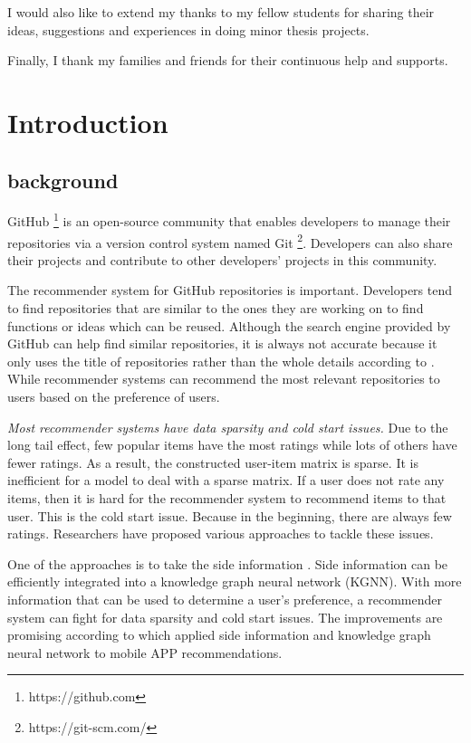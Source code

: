 \documentclass[11pt,twoside]{report}
\begin{document}
I would also like to extend my thanks to my fellow students for sharing their ideas, suggestions and experiences in doing minor thesis projects.

Finally, I thank my families and friends for their continuous help and supports.

{
    \hypersetup{linkcolor=black}
    \tableofcontents
    \listoffigures
    \listoftables
}


\chapter{Introduction}
\section{background}
GitHub \footnote{https://github.com} is an open-source community that enables developers to manage their repositories via a version control system named Git \footnote{https://git-scm.com/}. Developers can also share their projects and contribute to other developers’ projects in this community.

The recommender system for GitHub repositories is important. Developers tend to find repositories that are similar to the ones they are working on to find functions or ideas which can be reused. Although the search engine provided by GitHub can help find similar repositories, it is always not accurate because it only uses the title of repositories rather than the whole details according to \cite{xu_repersp_2017}. While recommender systems can recommend the most relevant repositories to users based on the preference of users.


\textit{Most recommender systems have data sparsity and cold start issues.} Due to the long tail effect, few popular items have the most ratings while lots of others have fewer ratings. As a result, the constructed user-item matrix is sparse. It is inefficient for a model to deal with a sparse matrix. If a user does not rate any items, then it is hard for the recommender system to recommend items to that user. This is the cold start issue. Because in the beginning, there are always few ratings. Researchers have proposed various approaches to tackle these issues.


One of the approaches is to take the side information \cite{jonschkowski_patterns_2016}. Side information can be efficiently integrated into a knowledge graph neural network (KGNN). With more information that can be used to determine a user's preference, a recommender system can fight for data sparsity and cold start issues. The improvements are promising according to \cite{zhang_knowledge_2020} which applied side information and knowledge graph neural network to mobile APP recommendations.
\end{document}
